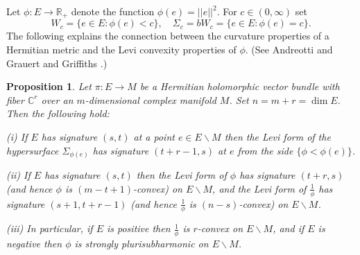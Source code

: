 \documentclass[11pt]{amsart}
\numberwithin{equation}{section}
\newtheorem{proposition}[theorem]{Proposition}
\theoremstyle{definition}
\begin{document}
Let $\phi\colon E\to {\mathbb{R}}_+$ denote the function $\phi(e)= ||e||^2$.
For $c\in (0,\infty)$ set
\[
	W_c =\{e\in E \colon  \phi(e)<c\}, \quad \Sigma_c=bW_c=\{e\in E\colon \phi(e)=c\}.
\]
The following explains the connection 
between the curvature properties of a  Hermitian metric 
and the Levi convexity properties of $\phi$.
(See Andreotti and Grau\-ert \cite[\S 23]{AG} 
and Griffiths \cite[p.\ 426]{Griffiths66}.)

\begin{proposition}
\label{signature}
Let $\pi\colon E\to M$ be a Hermitian holomorphic vector bundle with fiber ${\mathbb{C}}^r$
over an  $m$-dimensional complex manifold $M$. Set $n=m+r=\dim E$.
Then the following hold:

(i) If $E$ has signature $(s,t)$ at a point $e\in E{\backslash} M$ 
then the Levi form of the hypersurface $\Sigma_{\phi(e)}$ has signature 
$(t+r-1,s)$ at $e$ from the side $\{\phi<\phi(e)\}$. 

(ii)
If $E$ has signature $(s,t)$ then the Levi form of $\phi$ has
signature $(t+r,s)$ (and hence $\phi$ is $(m-t+1)$-convex) on $E{\backslash} M$,
and the Levi form of $\frac{1}{\phi}$ has signature $(s+1,t+r-1)$
(and hence $\frac{1}{\phi}$ is $(n-s)$-convex) on $E{\backslash} M$. 

(iii) In particular, if $E$ is positive then $\frac{1}{\phi}$ is $r$-convex on $E{\backslash} M$, 
and if $E$ is negative then $\phi$ is strongly plurisubharmonic on $E{\backslash} M$. 
\end{proposition}
\end{document}
